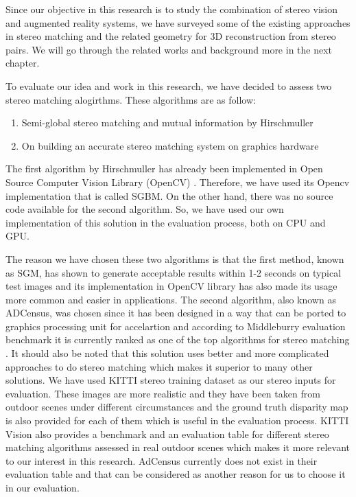 \documentclass[dvips,letterpaper,12pt]{report}
\begin{document}
Since our objective in this research is to study the combination of stereo vision and augmented reality systems, we have surveyed some of the existing approaches in stereo matching and the
related geometry for 3D reconstruction from stereo pairs. We will go through the related works and background more in the next chapter. 

To evaluate our idea and work in this research, we have decided to assess two stereo matching alogirthms. These algorithms are as follow:
\begin{enumerate}
\item Semi-global stereo matching and mutual information by Hirschmuller \cite{hir08}
\item On building an accurate stereo matching system on graphics hardware \cite{mei11}
\end{enumerate}

The first algorithm by Hirschmuller has already been implemented in Open Source Computer Vision Library (OpenCV) \cite{sgbm}. Therefore, we have used its Opencv implementation that is 
called SGBM. On the other hand, there was no source code available for the second algorithm. So, we have used our own implementation of this solution in the evaluation process, both on CPU and GPU.

The reason we have chosen these two algorithms is that the first method, known as SGM, has shown to generate acceptable results within 1-2 seconds on typical test images \cite{hir08} and 
its implementation in OpenCV library has also made its usage more common and easier in applications. The second algorithm, also known as ADCensus, was chosen since it has been designed in a way that
can be ported to graphics processing unit for accelartion and according to Middleburry evaluation benchmark it is currently ranked as one of the top algorithms for stereo matching \cite{mideval}.
It should also be noted that this solution uses better and more complicated approaches to do stereo matching which makes it superior to many other solutions.
We have used KITTI stereo training dataset \cite{kitti} as our stereo inputs for evaluation. These images are more realistic and they have been taken from outdoor scenes under different circumstances 
and the ground truth disparity map is also provided for each of them which is useful in the evaluation process. KITTI Vision also provides a benchmark and an evaluation table for different stereo 
matching algorithms assessed in real outdoor scenes which makes it more relevant to our interest in this research. AdCensus currently does not exist in their evaluation table and that can be
considered as another reason for us to choose it in our evaluation.
\end{document}
